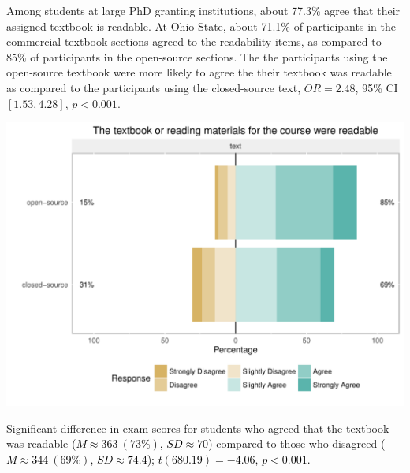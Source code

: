 \documentclass{ximera}
\begin{document}
Among students at large PhD granting institutions, about 77.3\% agree
that their assigned textbook is readable.  At Ohio State, about 71.1\%
of participants in the commercial textbook sections agreed to the
readability items, as compared to 85\% of participants in the
open-source sections.  The the participants using the open-source
textbook were more likely to agree the their textbook was readable as
compared to the participants using the closed-source text,
\(OR = 2.48\), 95\% CI \([ 1.53 , 4.28 ]\), \(p < 0.001\).

\begin{image}
  \includegraphics{more-readable.png}
\end{image}

Significant difference in exam scores for students who agreed that the
textbook was readable \textcolor{black}{(\(M \approx 363~(73\%)\),
  \(SD \approx 70\))} compared to those who disagreed
\textcolor{black}{(\(M \approx 344~(69\%)\), \(SD \approx 74.4\));}
\textcolor{black}{\(t( 680.19 ) = -4.06\), \(p < 0.001\).}
\end{document}
